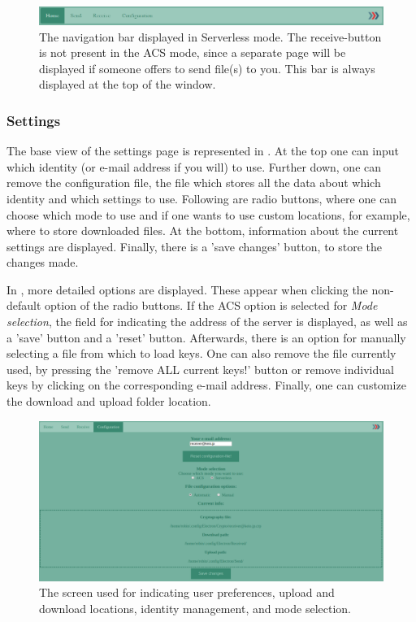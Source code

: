   \begin{figure}[H]
      \centering
      \includegraphics[width=\textwidth]{Figures/Base/navbar_sl}
      \decoRule
      \caption[SendIt: Navigation bar]{The navigation bar displayed in Serverless mode. The receive-button is not present in the ACS mode, since a separate page will be displayed if someone offers to send file(s) to you. This bar is always displayed at the top of the window.}
      \label{fig:hs_nb}
    \end{figure}
  \subsubsection*{Settings}
    The base view of the settings page is represented in . At the top one can input which identity (or e-mail address if you will) to use. Further down, one can remove the configuration file, the file which stores all the data about which identity and which settings to use. Following are radio buttons, where one can choose which mode to use and if one wants to use custom locations, for example, where to store downloaded files. At the bottom, information about the current settings are displayed. Finally, there is a 'save changes' button, to store the changes made.

    In , more detailed options are displayed. These appear when clicking the non-default option of the radio buttons. If the ACS option is selected for \emph{Mode selection}, the field for indicating the address of the server is displayed, as well as a 'save' button and a 'reset' button. Afterwards, there is an option for manually selecting a file from which to load keys. One can also remove the file currently used, by pressing the 'remove ALL current keys!' button or remove individual keys by clicking on the corresponding e-mail address. Finally, one can customize the download and upload folder location.
    \begin{figure}[H]
      \centering
      \includegraphics[width=\textwidth]{Figures/Base/Settings}
      \decoRule
      \caption[SendIt: Settings screen]{The screen used for indicating user preferences, upload and download locations, identity management, and mode selection.}
      \label{fig:sett}
    \end{figure}

